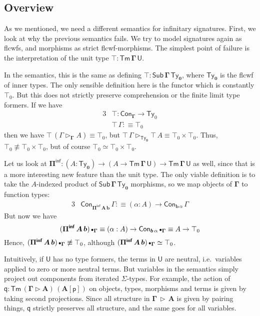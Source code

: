 \documentclass[12pt,a4paper,twoside,openany]{book}
\theoremstyle{remark}
\theoremstyle{definition}
\theoremstyle{theorem}
\newcommand{\bs}[1]{\boldsymbol{#1}}
\newcommand{\Con}{\mathsf{Con}}
\newcommand{\Sub}{\mathsf{Sub}}
\newcommand{\Tm}{\mathsf{Tm}}
\newcommand{\Ty}{\mathsf{Ty}}
\newcommand{\U}{\mathsf{U}}
\newcommand{\ext}{\triangleright}
\newcommand{\emptycon}{\scaleobj{.75}\bullet}
\newcommand{\Piinf}{\Pi^{\mathsf{inf}}}
\newcommand{\p}{\mathsf{p}}
\newcommand{\q}{\mathsf{q}}
\newcommand{\bGamma}{\bs{\Gamma}}
\newcommand{\bb}{\bs{b}}
\newcommand{\bU}{\bs{\U}}
\newcommand{\defn}{:\equiv}
\begin{document}
\subsection{Overview}

As we mentioned, we need a different semantics for infinitary signatures.
First, we look at why the previous semantics fails. We try to model signatures
again as flcwfs, and morphisms as strict flcwf-morphisms. The simplest point of
failure is the interpretation of the unit type $\bs{\top : \Tm\,\Gamma\,\U}$.

In the semantics, this is the same as defining $\bs{\top :
  \Sub\,\Gamma\,\Ty_0}$, where $\bs{\Ty_0}$ is the flcwf of inner types. The
only sensible definition here is the functor which is constantly $\top_0$. But
this does not strictly preserve comprehension or the finite limit type formers.
If we have
\begin{alignat*}{3}
  &\bs{\top} : \Con_{\bGamma} \to \Ty_0\\
  &\bs{\top}\,\Gamma \defn \top_0
\end{alignat*}
then we have $\bs{\top}\,(\Gamma \ext_{\bGamma} A) \equiv \top_0$, but
$\bs{\top}\,\Gamma \ext_{\bs{\Ty_0}} \bs{\top}\,A \equiv \top_0 \times \top_0$.
Thus, $\top_0 \not\equiv \top_0 \times \top_0$, but of course $\top_0 \simeq
\top_0 \times \top_0$.

Let us look at $\bs{\Piinf} : (A : \bs{\Ty_0}) \to (A \to \bs{\Tm\,\Gamma\,\U}) \to
\bs{\Tm\,\Gamma\,\U}$ as well, since that is a more interesting new feature than the
unit type. The only viable definition is to take the $A$-indexed product of
$\bs{\Sub\,\Gamma\,\Ty_0}$ morphisms, so we map objects of $\bGamma$ to function types:
\begin{alignat*}{3}
  &\Con_{\bs{\Piinf\,A\,b}}\,\Gamma \defn (\alpha : A) \to \Con_{\bb\,\alpha}\,\Gamma
\end{alignat*}
But now we have
\[(\bs{\Piinf\,A\,b})\,\emptycon_{\bGamma} \equiv (\alpha : A) \to \Con_{\bb\,\alpha}\,\emptycon_{\bGamma}
   \equiv A \to \top_0\]
Hence, $(\bs{\Piinf\,A\,b})\,\emptycon_{\bGamma} \not\equiv \top_0$, although
$(\bs{\Piinf\,A\,b})\,\emptycon_{\bGamma} \simeq \top_0$.

Intuitively, if $\bU$ has no type formers, the terms in $\bU$ are neutral,
i.e.\ variables applied to zero or more neutral terms. But variables in the
semantics simply project out components from iterated $\Sigma$-types. For
example, the action of $\bs{\q} : \bs{\Tm\,(\Gamma \ext A)\,(A[\p])}$ on
objects, types, morphisms and terms is given by taking second
projections. Since all structure in $\bs{\Gamma\,\ext\,A}$ is given by pairing
things, $\bs{\q}$ strictly preserves all structure, and the same goes
for all variables.
\end{document}
